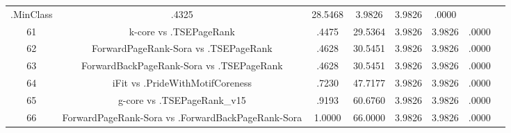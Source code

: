 \documentclass[a4paper,10pt]{article}
\begin{document}
\begin{landscape}
\begin{table}[!htp]
\begin{tabular}{cccccccc}
.MinClass&.4325&28.5468&3.9826&3.9826&.0000\\61&k-core vs .TSEPageRank&.4475&29.5364&3.9826&3.9826&.0000\\62&ForwardPageRank-Sora vs .TSEPageRank&.4628&30.5451&3.9826&3.9826&.0000\\63&ForwardBackPageRank-Sora vs .TSEPageRank&.4628&30.5451&3.9826&3.9826&.0000\\64&iFit vs .PrideWithMotifCoreness&.7230&47.7177&3.9826&3.9826&.0000\\65&g-core vs .TSEPageRank_v15&.9193&60.6760&3.9826&3.9826&.0000\\66&ForwardPageRank-Sora vs .ForwardBackPageRank-Sora&1.0000&66.0000&3.9826&3.9826&.0000\\\hline
\end{tabular}
\end{table}

\end{landscape}
\end{document}
